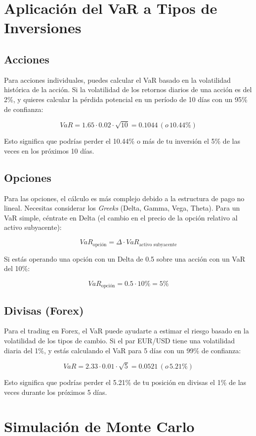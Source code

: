 \documentclass{article}
\begin{document}
\section{Aplicación del VaR a Tipos de Inversiones}

\subsection{Acciones}
Para acciones individuales, puedes calcular el VaR basado en la volatilidad histórica de la acción. Si la volatilidad de los retornos diarios de una acción es del 2\%, y quieres calcular la pérdida potencial en un período de 10 días con un 95\% de confianza:

\[
VaR = 1.65 \cdot 0.02 \cdot \sqrt{10} = 0.1044 \, (o \, 10.44\%)
\]

Esto significa que podrías perder el 10.44\% o más de tu inversión el 5\% de las veces en los próximos 10 días.

\subsection{Opciones}
Para las opciones, el cálculo es más complejo debido a la estructura de pago no lineal. Necesitas considerar los \textit{Greeks} (Delta, Gamma, Vega, Theta). Para un VaR simple, céntrate en Delta (el cambio en el precio de la opción relativo al activo subyacente):

\[
VaR_{\text{opción}} = \Delta \cdot VaR_{\text{activo subyacente}}
\]

Si estás operando una opción con un Delta de 0.5 sobre una acción con un VaR del 10\%:

\[
VaR_{\text{opción}} = 0.5 \cdot 10\% = 5\%
\]

\subsection{Divisas (Forex)}
Para el trading en Forex, el VaR puede ayudarte a estimar el riesgo basado en la volatilidad de los tipos de cambio. Si el par EUR/USD tiene una volatilidad diaria del 1\%, y estás calculando el VaR para 5 días con un 99\% de confianza:

\[
VaR = 2.33 \cdot 0.01 \cdot \sqrt{5} = 0.0521 \, (o \, 5.21\%)
\]

Esto significa que podrías perder el 5.21\% de tu posición en divisas el 1\% de las veces durante los próximos 5 días.

\section{Simulación de Monte Carlo}
\end{document}
